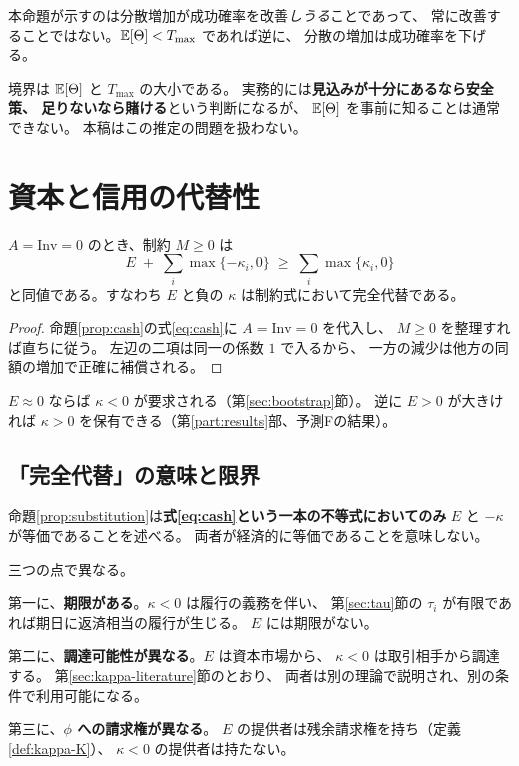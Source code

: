 \begin{remark}[証明の限界]
\label{rem:deadline-limit}
本命題が示すのは分散増加が成功確率を改善\emph{しうる}ことであって、
常に改善することではない。$\mathbb{E}[\Theta]<T_{\max}$ であれば逆に、
分散の増加は成功確率を下げる。

境界は $\mathbb{E}[\Theta]$ と $T_{\max}$ の大小である。
実務的には\textbf{見込みが十分にあるなら安全策、
足りないなら賭ける}という判断になるが、
$\mathbb{E}[\Theta]$ を事前に知ることは通常できない。
本稿はこの推定の問題を扱わない。
\end{remark}

\section{資本と信用の代替性}

\begin{proposition}[代替関係]
\label{prop:substitution}
$A=\mathrm{Inv}=0$ のとき、制約 $M\geq 0$ は
\begin{equation}
E \;+\; \sum_i \max\{-\kappa_i,0\} \;\geq\; \sum_i \max\{\kappa_i,0\}
\end{equation}
と同値である。すなわち $E$ と負の $\kappa$ は制約式において完全代替である。
\end{proposition}

\begin{proof}
命題\ref{prop:cash}の式\eqref{eq:cash}に $A=\mathrm{Inv}=0$ を代入し、
$M\geq 0$ を整理すれば直ちに従う。
左辺の二項は同一の係数 $1$ で入るから、
一方の減少は他方の同額の増加で正確に補償される。
\end{proof}

\begin{corollary}[双方向の含意]
$E\approx 0$ ならば $\kappa<0$ が要求される（第\ref{sec:bootstrap}節）。
逆に $E>0$ が大きければ $\kappa>0$ を保有できる（第\ref{part:results}部、予測Fの結果）。
\end{corollary}

\subsection{「完全代替」の意味と限界}

\begin{remark}[代替は制約式においてのみ成立する]
\label{rem:substitution-limit}
命題\ref{prop:substitution}は\textbf{式\eqref{eq:cash}という一本の不等式においてのみ}
$E$ と $-\kappa$ が等価であることを述べる。
両者が経済的に等価であることを意味しない。

三つの点で異なる。

第一に、\textbf{期限がある}。$\kappa<0$ は履行の義務を伴い、
第\ref{sec:tau}節の $\tau_i$ が有限であれば期日に返済相当の履行が生じる。
$E$ には期限がない。

第二に、\textbf{調達可能性が異なる}。$E$ は資本市場から、
$\kappa<0$ は取引相手から調達する。
第\ref{sec:kappa-literature}節のとおり、
両者は別の理論で説明され、別の条件で利用可能になる。

第三に、\textbf{$\phi$ への請求権が異なる}。
$E$ の提供者は残余請求権を持ち（定義\ref{def:kappa-K}）、
$\kappa<0$ の提供者は持たない。
\end{remark}

